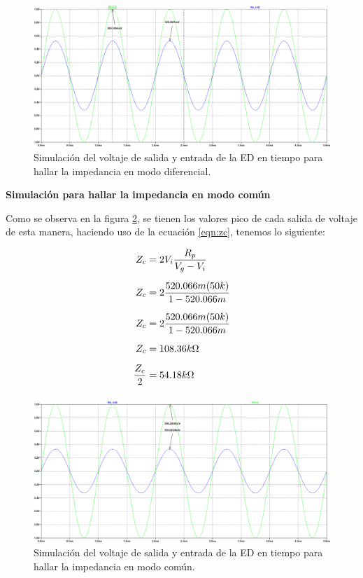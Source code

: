 \begin{enumerate}
        \begin{figure}[H]
          \centering
          \includegraphics[width=\textwidth]{Imagenes/zd_ed.png}
          \caption{Simulación del voltaje de salida y entrada de la ED en tiempo para hallar la impedancia en modo diferencial.}
          \label{fig:zded}
        \end{figure}

        \textbf{Simulación para hallar la impedancia en modo común}

        Como se observa en la figura \ref{fig:zced}, se tienen los valores pico de cada salida de voltaje de esta manera, haciendo uso de la ecuación \ref{eqn:zc}, tenemos lo siguiente:

        \begin{align*}
          Z_{c}            & = 2V_i \dfrac{R_p}{V_g-V_i}         \\[0.2cm]
          Z_{c}            & =2\dfrac{520.066m(50k)}{1-520.066m} \\[0.2cm]
          Z_{c}            & =2\dfrac{520.066m(50k)}{1-520.066m} \\[0.2cm]
          Z_{c}            & =108.36k\ohm                        \\[0.2cm]
          \dfrac{Z_{c}}{2} & =54.18k\ohm                         \\[0.2cm]
        \end{align*}

        \begin{figure}[H]
          \centering
          \includegraphics[width=\textwidth]{Imagenes/zc_ed.png}
          \caption{Simulación del voltaje de salida y entrada de la ED en tiempo para hallar la impedancia en modo común.}
          \label{fig:zced}
        \end{figure}


\end{enumerate}
